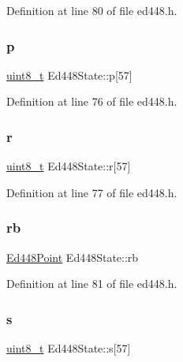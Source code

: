 Definition at line 80 of file ed448.\+h.

\mbox{\label{structEd448State_a0f0eb37b77a1011d319079256fe00115}} 
\subsubsection{\texorpdfstring{p}{p}}
{\footnotesize\ttfamily \hyperlink{stdint_8h_aba7bc1797add20fe3efdf37ced1182c5}{uint8\+\_\+t} Ed448\+State\+::p\mbox{[}57\mbox{]}}



Definition at line 76 of file ed448.\+h.

\mbox{\label{structEd448State_ad5b8473d4a83e8fdd2c400f52c0bb64c}} 
\subsubsection{\texorpdfstring{r}{r}}
{\footnotesize\ttfamily \hyperlink{stdint_8h_aba7bc1797add20fe3efdf37ced1182c5}{uint8\+\_\+t} Ed448\+State\+::r\mbox{[}57\mbox{]}}



Definition at line 77 of file ed448.\+h.

\mbox{\label{structEd448State_ab000b2957cda8c96b2ea63f23de28381}} 
\subsubsection{\texorpdfstring{rb}{rb}}
{\footnotesize\ttfamily \hyperlink{structEd448Point}{Ed448\+Point} Ed448\+State\+::rb}



Definition at line 81 of file ed448.\+h.

\mbox{\label{structEd448State_a1072024363ba04b1a3162b1a0f0caa38}} 
\subsubsection{\texorpdfstring{s}{s}}
{\footnotesize\ttfamily \hyperlink{stdint_8h_aba7bc1797add20fe3efdf37ced1182c5}{uint8\+\_\+t} Ed448\+State\+::s\mbox{[}57\mbox{]}}



